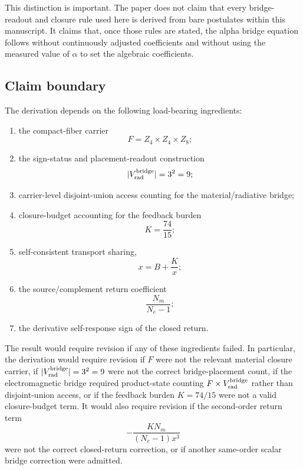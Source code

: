 This distinction is important. The paper does not claim that every
bridge-readout and closure rule used here is derived from bare postulates
within this manuscript. It claims that, once those rules are stated, the
alpha bridge equation follows without continuously adjusted coefficients
and without using the measured value of \(\alpha\) to set the algebraic
coefficients.

\subsection{Claim boundary}

The derivation depends on the following load-bearing ingredients:
\begin{enumerate}[label=(\arabic*)]
\item the compact-fiber carrier
\[
F=Z_4\times Z_4\times Z_8;
\]

\item the sign-status and placement-readout construction
\[
|V_{\rm rad}^{\rm bridge}|=3^2=9;
\]

\item carrier-level disjoint-union access counting for the
material/radiative bridge;

\item closure-budget accounting for the feedback burden
\[
K=\frac{74}{15};
\]

\item self-consistent transport sharing,
\[
x=B+\frac{K}{x};
\]

\item the source/complement return coefficient
\[
\frac{N_m}{N_e-1};
\]

\item the derivative self-response sign of the closed return.
\end{enumerate}

The result would require revision if any of these ingredients failed. In
particular, the derivation would require revision if \(F\) were not the
relevant material closure carrier, if
\(|V_{\rm rad}^{\rm bridge}|=3^2=9\) were not the correct
bridge-placement count, if the electromagnetic bridge required
product-state counting \(F\times V_{\rm rad}^{\rm bridge}\) rather than
disjoint-union access, or if the feedback burden \(K=74/15\) were not a
valid closure-budget term. It would also require revision if the
second-order return term
\[
-\frac{K N_m}{(N_e-1)x^3}
\]
were not the correct closed-return correction, or if another same-order
scalar bridge correction were admitted.

